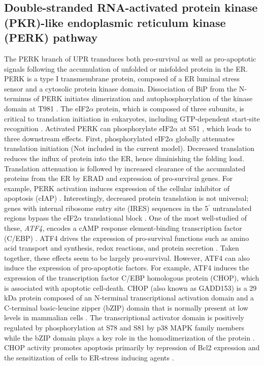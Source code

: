 \documentclass[fleqn,10pt]{wlscirep}
\begin{document}
\subsection*{Double-stranded RNA-activated protein kinase (PKR)-like endoplasmic reticulum kinase (PERK) pathway}
The PERK branch of UPR transduces both pro-survival as well as pro-apoptotic signals following the accumulation of unfolded or misfolded protein in the ER. PERK is a type I transmembrane protein, composed of a ER luminal stress sensor and a cytosolic protein kinase domain. Dissociation of BiP from the N-terminus of PERK initiates dimerization and autophosphorylation of the kinase domain at T981 \cite{Kebache:2004kx}. The eIF2$\alpha$ protein, which is composed of three subunits, is critical to translation initiation in eukaryotes, including GTP-dependent start-site recognition \cite{Merrick:2004lr}. Activated PERK can phosphorylate eIF2$\alpha$ at S51 \cite{harding1999pta,Raven:2008fu}, which leads to three downstream effects. First, phosphorylated eIF2$\alpha$ globally attenuates translation initiation (Not included in the current model). Decreased translation reduces the influx of protein into the ER, hence diminishing the folding load. Translation attenuation is followed by increased clearance of the accumulated proteins from the ER by ERAD and expression of pro-survival genes. For example, PERK activation induces expression of the cellular inhibitor of apoptosis (cIAP) \cite{hamanaka2008pdr}. Interestingly, decreased protein translation is not universal; genes with internal ribosome entry site (IRES) sequences in the 5$^{\prime}$ untranslated regions bypass the eIF2$\alpha$ translational block \cite{Schroder:2005vn}. One of the most well-studied of these, \emph{ATF4}, encodes a cAMP response element-binding transcription factor (C/EBP) \cite{lu2004tra}. ATF4 drives the expression of pro-survival functions such as amino acid transport and synthesis, redox reactions, and protein secretion \cite{harding2003isr}. Taken together, these effects seem to be largely pro-survival. However, ATF4 can also induce the expression of pro-apoptotic factors. For example, ATF4 induces the expression of the transcription factor C/EBP homologous protein (CHOP), which is associated with apoptotic cell-death. CHOP (also known as GADD153) is a 29 kDa protein composed of an N-terminal transcriptional activation domain and a C-terminal basic-leucine zipper (bZIP) domain that is normally present at low levels in mammalian cells \cite{ron1992cnd}. The transcriptional activator domain is positively regulated by phosphorylation at S78 and S81 by p38 MAPK family members \cite{wang272sip,maytin2001sit} while the bZIP domain plays a key role in the homodimerization of the protein \cite{matsumoto1996eec,maytin2001sit}. CHOP activity promotes apoptosis primarily by repression of Bcl2 expression and the sensitization of cells to ER-stress inducing agents \cite{gotoh:hdc,mccullough2001gsc}.
\end{document}
